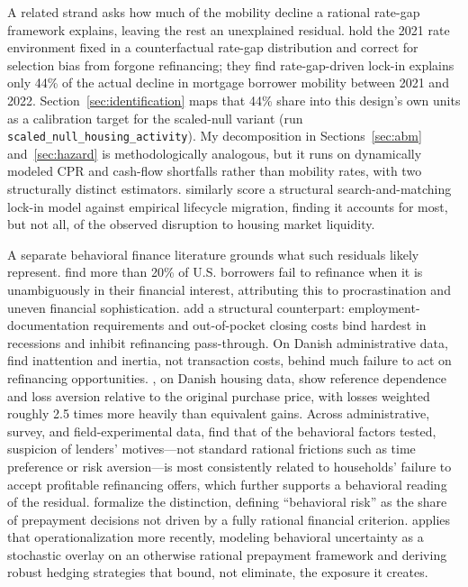\documentclass[12pt]{article}
\begin{document}
A related strand asks how much of the mobility decline a rational rate-gap framework explains, leaving the rest an unexplained residual. \citet{aladangady2024} hold the 2021 rate environment fixed in a counterfactual rate-gap distribution and correct for selection bias from forgone refinancing; they find rate-gap-driven lock-in explains only 44\% of the actual decline in mortgage borrower mobility between 2021 and 2022. Section~\ref{sec:identification} maps that 44\% share into this design's own units as a calibration target for the scaled-null variant (run \texttt{scaled\_null\_housing\_activity}). My decomposition in Sections~\ref{sec:abm} and~\ref{sec:hazard} is methodologically analogous, but it runs on dynamically modeled CPR and cash-flow shortfalls rather than mobility rates, with two structurally distinct estimators. \citet{gerardi2024} similarly score a structural search-and-matching lock-in model against empirical lifecycle migration, finding it accounts for most, but not all, of the observed disruption to housing market liquidity.

A separate behavioral finance literature grounds what such residuals likely represent. \citet{keys2016} find more than 20\% of U.S. borrowers fail to refinance when it is unambiguously in their financial interest, attributing this to procrastination and uneven financial sophistication. \citet{defusco2020} add a structural counterpart: employment-documentation requirements and out-of-pocket closing costs bind hardest in recessions and inhibit refinancing pass-through. On Danish administrative data, \citet{andersen2020} find inattention and inertia, not transaction costs, behind much failure to act on refinancing opportunities. \citet{andersen2022}, on Danish housing data, show reference dependence and loss aversion relative to the original purchase price, with losses weighted roughly 2.5 times more heavily than equivalent gains. Across administrative, survey, and field-experimental data, \citet{johnson2019} find that of the behavioral factors tested, suspicion of lenders' motives---not standard rational frictions such as time preference or risk aversion---is most consistently related to households' failure to accept profitable refinancing offers, which further supports a behavioral reading of the residual. \citet{bissiri2014} formalize the distinction, defining ``behavioral risk'' as the share of prepayment decisions not driven by a fully rational financial criterion. \citet{perotti2024} applies that operationalization more recently, modeling behavioral uncertainty as a stochastic overlay on an otherwise rational prepayment framework and deriving robust hedging strategies that bound, not eliminate, the exposure it creates.
\end{document}
